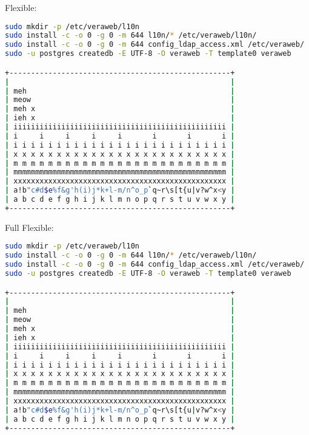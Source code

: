 \documentclass{tarentanleitung}
\begin{document}
\begin{minipage}{\textwidth}
Flexible:

\begin{lstlisting}[language=sh,columns=flexible]
sudo mkdir -p /etc/veraweb/l10n
sudo install -c -o 0 -g 0 -m 644 l10n/* /etc/veraweb/l10n/
sudo install -c -o 0 -g 0 -m 644 config_ldap_access.xml /etc/veraweb/
sudo -u postgres createdb -E UTF-8 -O veraweb -T template0 veraweb

+---------------------------------------------------+
|                                                   |
| meh                                               |
| meow                                              |
| meh x                                             |
| ieh x                                             |
| iiiiiiiiiiiiiiiiiiiiiiiiiiiiiiiiiiiiiiiiiiiiiiiii |
| i     i     i     i     i       i       i       i |
| i i i i i i i i i i i i i i i i i i i i i i i i i |
| x x x x x x x x x x x x x x x x x x x x x x x x x |
| m m m m m m m m m m m m m m m m m m m m m m m m m |
| mmmmmmmmmmmmmmmmmmmmmmmmmmmmmmmmmmmmmmmmmmmmmmmmm |
| xxxxxxxxxxxxxxxxxxxxxxxxxxxxxxxxxxxxxxxxxxxxxxxxx |
| a!b"c#d$e%f&g'h(i)j*k+l-m/n^o_p`q~r\s[t{u|v?w^x<y |
| a b c d e f g h i j k l m n o p q r s t u v w x y |
+---------------------------------------------------+

\end{lstlisting}
\end{minipage}

\begin{minipage}{\textwidth}
Full Flexible:

\begin{lstlisting}[language=sh,columns=fullflexible]
sudo mkdir -p /etc/veraweb/l10n
sudo install -c -o 0 -g 0 -m 644 l10n/* /etc/veraweb/l10n/
sudo install -c -o 0 -g 0 -m 644 config_ldap_access.xml /etc/veraweb/
sudo -u postgres createdb -E UTF-8 -O veraweb -T template0 veraweb

+---------------------------------------------------+
|                                                   |
| meh                                               |
| meow                                              |
| meh x                                             |
| ieh x                                             |
| iiiiiiiiiiiiiiiiiiiiiiiiiiiiiiiiiiiiiiiiiiiiiiiii |
| i     i     i     i     i       i       i       i |
| i i i i i i i i i i i i i i i i i i i i i i i i i |
| x x x x x x x x x x x x x x x x x x x x x x x x x |
| m m m m m m m m m m m m m m m m m m m m m m m m m |
| mmmmmmmmmmmmmmmmmmmmmmmmmmmmmmmmmmmmmmmmmmmmmmmmm |
| xxxxxxxxxxxxxxxxxxxxxxxxxxxxxxxxxxxxxxxxxxxxxxxxx |
| a!b"c#d$e%f&g'h(i)j*k+l-m/n^o_p`q~r\s[t{u|v?w^x<y |
| a b c d e f g h i j k l m n o p q r s t u v w x y |
+---------------------------------------------------+

\end{lstlisting}
\end{minipage}
\end{document}
